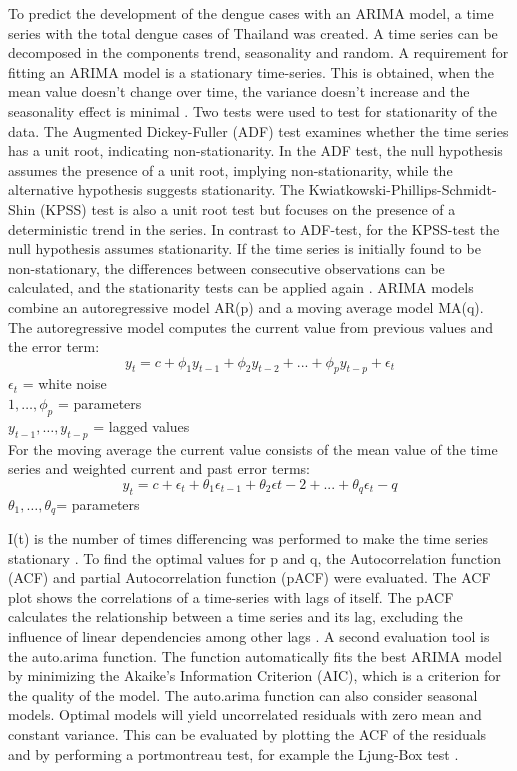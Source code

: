 To predict the development of the dengue cases with an ARIMA model, a time series with the total dengue cases of Thailand was created. A time series can be decomposed in the components trend, seasonality and random. 
A requirement for fitting an ARIMA model is a stationary time-series. This is obtained, when the mean value doesn’t change over time, the variance doesn’t increase and the seasonality effect is minimal \citep{Prabhakaran2017}. Two tests were used to test for stationarity of the data. The Augmented Dickey-Fuller (ADF) test examines whether the time series has a unit root, indicating non-stationarity. In the ADF test, the null hypothesis assumes the presence of a unit root, implying non-stationarity, while the alternative hypothesis suggests stationarity. The Kwiatkowski-Phillips-Schmidt-Shin (KPSS) test is also a unit root test but focuses on the presence of a deterministic trend in the series. In contrast to ADF-test, for the KPSS-test the null hypothesis assumes stationarity. If the time series is initially found to be non-stationary, the differences between consecutive observations can be calculated, and the stationarity tests can be applied again \citep{Hyndman2018}.
ARIMA models combine an autoregressive model AR(p) and a moving average model MA(q). 
The autoregressive model computes the current value from previous values and the error term:
	\[y_t = c + \phi_1 y_{t-1} + \phi_2 y_{t-2}+...+ \phi_p y_{t-p}+ \epsilon _t\]
	$\epsilon _t$ = white noise\\
	$1,…,\phi _p$ = parameters\\
	$y_{t-1},…, y_{t-p}$ = lagged values \\
	
	For the moving average the current value consists of the mean value of the time series and weighted current and past error terms: 
	\[y_t=c+\epsilon _t+\theta_1 \epsilon _{t-1}+\theta_2 \epsilon t-2+...+\theta_q \epsilon _t-q\]
	$\theta_1,…, \theta _q $= parameters
	
I(t) is the number of times differencing was performed to make the time series stationary \citep{Venkat2018}.
To find the optimal values for p and q, the Autocorrelation function (ACF) and partial Autocorrelation function (pACF) were evaluated. The ACF plot shows the correlations of a time-series with lags of itself.  The pACF calculates the relationship between a time series and its lag, excluding the influence of linear dependencies among other lags \citep{Prabhakaran2017}.
A second evaluation tool is the auto.arima function. The function automatically fits the best ARIMA model by minimizing the Akaike’s Information Criterion (AIC), which is a criterion for the quality of the model. The auto.arima function can also consider seasonal models. 
Optimal models will yield uncorrelated residuals with zero mean and constant variance. This can be evaluated by plotting the ACF of the residuals and by performing a portmontreau test, for example the Ljung-Box test \citep{Hyndman2018}.

